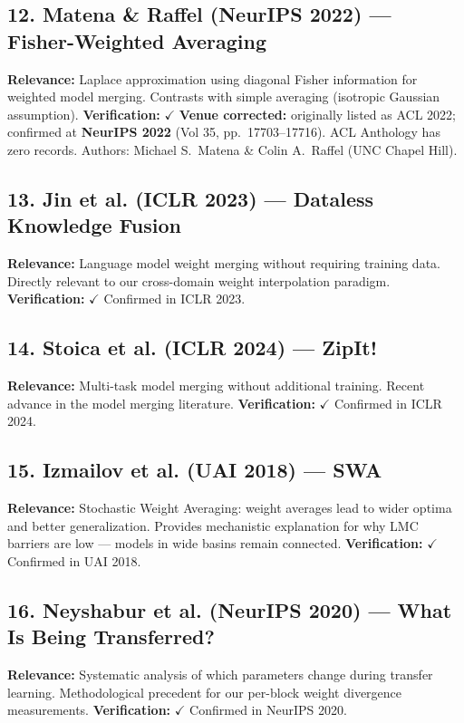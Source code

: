 \documentclass[11pt,a4paper]{article}
\begin{document}
\subsection*{12. Matena \& Raffel (NeurIPS 2022) --- Fisher-Weighted Averaging}
\textbf{Relevance:} Laplace approximation using diagonal Fisher information for weighted model merging. Contrasts with simple averaging (isotropic Gaussian assumption). \textbf{Verification:} $\checkmark$ \textbf{Venue corrected:} originally listed as ACL 2022; confirmed at \textbf{NeurIPS 2022} (Vol 35, pp.\ 17703--17716). ACL Anthology has zero records. Authors: Michael S.\ Matena \& Colin A.\ Raffel (UNC Chapel Hill).

\subsection*{13. Jin et al. (ICLR 2023) --- Dataless Knowledge Fusion}
\textbf{Relevance:} Language model weight merging without requiring training data. Directly relevant to our cross-domain weight interpolation paradigm. \textbf{Verification:} $\checkmark$ Confirmed in ICLR 2023.

\subsection*{14. Stoica et al. (ICLR 2024) --- ZipIt!}
\textbf{Relevance:} Multi-task model merging without additional training. Recent advance in the model merging literature. \textbf{Verification:} $\checkmark$ Confirmed in ICLR 2024.

\subsection*{15. Izmailov et al. (UAI 2018) --- SWA}
\textbf{Relevance:} Stochastic Weight Averaging: weight averages lead to wider optima and better generalization. Provides mechanistic explanation for why LMC barriers are low --- models in wide basins remain connected. \textbf{Verification:} $\checkmark$ Confirmed in UAI 2018.

\subsection*{16. Neyshabur et al. (NeurIPS 2020) --- What Is Being Transferred?}
\textbf{Relevance:} Systematic analysis of which parameters change during transfer learning. Methodological precedent for our per-block weight divergence measurements. \textbf{Verification:} $\checkmark$ Confirmed in NeurIPS 2020.
\end{document}
